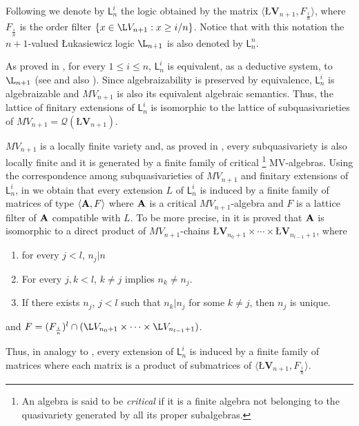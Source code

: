\documentclass{article}
\theoremstyle{definition}
\newcommand{\algLfin}{\textbf{\L}\mathbf{V}}
\newcommand{\domLfin}{{\L}V}
\begin{document}
Following \cite{CoEsGiGo} we denote by $\mathsf{L}_{n}^{i}$  the logic obtained by the matrix $\langle \algLfin_{n+1}, F_{\frac{i}{n}}  \rangle$, where $F_{\frac{i}{n}}$ is the order filter $\{ x \in \domLfin_{n+1} : x \geq i/n \}$.  Notice that with this notation the $n+1$-valued {\L}ukasiewicz logic $ \L_{n+1}$ is also denoted by $\mathsf{L}_{n}^{n}$.

As proved in \cite[Theorem 5.2]{CoEsGiGo}, for every $1\leq i \leq n$, $\mathsf{L}_{n}^{i}$  is equivalent, as a deductive system, to $ \L_{n+1}$ (see \cite{blok:pig:01} and also \cite{Blok-Pigozzi:DeductionTheorems}). Since algebraizability is preserved by equivalence, $\mathsf{L}_{n}^{i}$ is algebraizable and $MV_{n+1}$ is also its equivalent algebraic semantics. Thus, the lattice of finitary extensions of  $\mathsf{L}_{n}^{i}$ is isomorphic to the lattice of subquasivarieties of $MV_{n+1}=\mathcal{Q}(\algLfin_{n+1})$.

$MV_{n+1}$ is a locally finite variety and, as proved in \cite{GT14}, every subquasivariety is also locally finite and it is generated by a finite family of critical \footnote{An algebra is said to be {\em critical} if it is a finite algebra not belonging to the quasivariety generated by all its proper subalgebras.} MV-algebras.   Using the correspondence among subquasivarieties of $MV_{n+1}$ and finitary extensions  of   $\mathsf{L}_{n}^{i}$, in \cite{CoEsGiGo} we obtain that every extension $L$ of $\mathsf{L}_{n}^{i}$ is induced by a finite family  of matrices of type $\langle {\bf A},F\rangle$ where $\bf A$ is a critical $MV_{n+1}$-algebra  and $F$ is a lattice filter of $\bf A$ compatible with $L$. To be more precise, in \cite{GT14,CoEsGiGo} it is proved that $\bf A$ is isomorphic to a direct product of $MV_{n+1}$-chains $\algLfin_{n_{0}+1}\times\cdots\times\algLfin_{n_{l-1}+1}$,  where
\begin{enumerate}
 \item for every $j<l$, $n_{j}|n$
 \item For every $j, k<l$, $ k\neq j$ implies $ n_{k}\neq n_{j}$.
 \item If there exists $n_{j}$, $j<l$ such that $n_{k}|n_{j}$ for some
  $k\neq j$, then $n_{j}$ is unique.
\end{enumerate}
and $F=(F_{\frac{i}{n}})^{l}\cap (\domLfin_{n_{0}+1}\times\cdots\times \domLfin_{n_{l-1}+1})$.

Thus, in analogy to \cite[Theorem 3]{CoEsGo}, every extension of $\mathsf{L}_{n}^{i}$ is induced by a finite family of matrices where each matrix is a product of submatrices of $\langle \algLfin_{n+1}, F_{\frac{i}{n}}  \rangle$.
\end{document}
